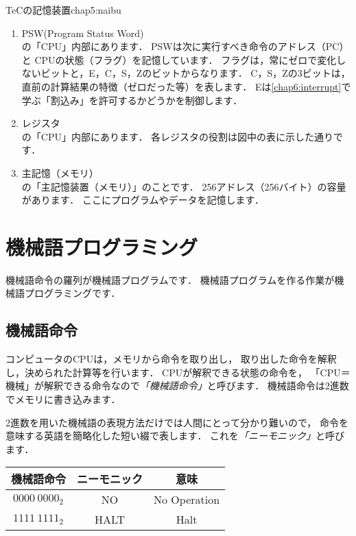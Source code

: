           {TeCの記憶装置}{chap5:naibu}

\begin{enumerate}
\item PSW(Program Status Word) \\
  の「CPU」内部にあります．
  PSWは次に実行すべき命令のアドレス（PC）と
  CPUの状態（フラグ）を記憶しています．
  フラグは，常にゼロで変化しないビットと，E，C，S，Zのビットからなります．
  C，S，Zの3ビットは，直前の計算結果の特徴（ゼロだった等）を表します．
  Eは\ref{chap6:interrupt}で学ぶ「割込み」を許可するかどうかを制御します．
\item レジスタ \\
  の「CPU」内部にあります．
  各レジスタの役割は図中の表に示した通りです．
\item 主記憶（メモリ） \\
  の「主記憶装置（メモリ）」のことです．
  256アドレス（256バイト）の容量があります．
  ここにプログラムやデータを記憶します．
\end{enumerate}

\newpage
\section{機械語プログラミング}
機械語命令の羅列が機械語プログラムです．
機械語プログラムを作る作業が機械語プログラミングです．

\subsection{機械語命令}
コンピュータのCPUは，メモリから命令を取り出し，
取り出した命令を解釈し，決められた計算等を行います．
CPUが解釈できる状態の命令を，
「CPU＝機械」が解釈できる命令なので\emph{「機械語命令」}と呼びます．
機械語命令は2進数でメモリに書き込みます．

2進数を用いた機械語の表現方法だけでは人間にとって分かり難いので，
命令を意味する英語を簡略化した短い綴で表します．
これを\emph{「ニーモニック」}と呼びます．

{\ttfamily\small\begin{center}
  \begin{tabular}{|c|c|c|} \hline
    機械語命令 & ニーモニック & 意味\\
    \hline
    $0000~0000_{2}$ & NO & No Operation \\
    $1111~1111_{2}$ & HALT & Halt \\
    \hline
  \end{tabular}
\end{center}}

